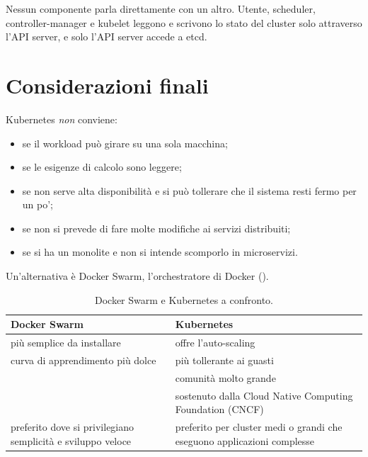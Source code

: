 \begin{idea}
Nessun componente parla direttamente con un altro. Utente, scheduler, controller-manager e kubelet leggono e scrivono
lo stato del cluster solo attraverso l'API server, e solo l'API server accede a etcd.
\end{idea}

\section{Considerazioni finali}
\label{sec:k8s-conclusioni}

Kubernetes \emph{non} conviene:
\begin{itemize}
  \item se il workload può girare su una sola macchina;
  \item se le esigenze di calcolo sono leggere;
  \item se non serve alta disponibilità e si può tollerare che il sistema resti fermo per un po';
  \item se non si prevede di fare molte modifiche ai servizi distribuiti;
  \item se si ha un monolite e non si intende scomporlo in microservizi.
\end{itemize}

Un'alternativa è Docker Swarm, l'orchestratore di Docker ().

\begin{table}[ht]
\centering
\small
\caption{Docker Swarm e Kubernetes a confronto.}
\label{tab:k8s-swarm}
\begin{tabularx}{\linewidth}{>{\raggedright\arraybackslash}X>{\raggedright\arraybackslash}X}
\toprule
Docker Swarm & Kubernetes \\
\midrule
più semplice da installare & offre l'auto-scaling \\
curva di apprendimento più dolce & più tollerante ai guasti \\
 & comunità molto grande \\
 & sostenuto dalla Cloud Native Computing Foundation (CNCF) \\
\midrule
preferito dove si privilegiano semplicità e sviluppo veloce & preferito per cluster medi o grandi che eseguono
  applicazioni complesse \\
\bottomrule
\end{tabularx}
\end{table}

